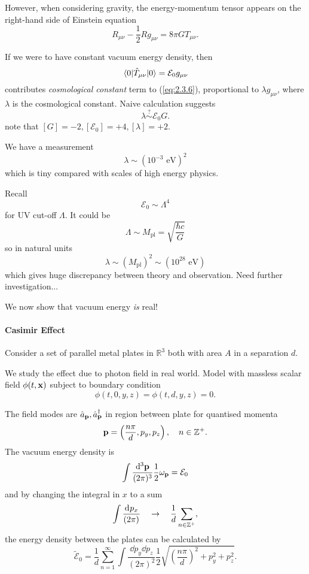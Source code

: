 \documentclass[a4paper,11pt]{article}
\begin{document}
	However, when considering gravity, the energy-momentum tensor appears on the right-hand side of Einstein equation
	\begin{equation}
		R _{\mu \nu} - \frac{1}{2} R g _{\mu \nu} = 8 \pi G T _{\mu \nu}.
		\label{eq:2.3.6}
	\end{equation}

	
	If we were to have constant vacuum energy density, then
	\[
		\mel{0}{\hat T _{\mu \nu}}{0} = \mathcal{E}_0 g _{\mu \nu}
	\]
	contributes \emph{cosmological constant} term to (\ref{eq:2.3.6}), proportional to $\lambda g _{\mu \nu}$, where $\lambda$ is the cosmological constant. Naive calculation suggests
	\[
		\lambda \overset{?}{\sim} \mathcal{E}_0 G.
	\]
	note that $[G] = -2, [\mathcal{E}_0] = + 4, [\lambda] = +2$. 

	We have a measurement
	\[
		\lambda \sim (10 ^{-3}\text{ eV})^2
	\]
	which is tiny compared with scales of high energy physics.

	Recall
	\[
		\mathcal{E}_0 \sim \Lambda^4
	\]
	for UV cut-off $\Lambda$. It could be
	\[
		\Lambda \sim M _{\text{pl}} = \sqrt{\frac{\hbar c}{G}}
	\]
	so in natural units
	\[
		\lambda \sim (M _{\text{pl}})^2 \sim (10 ^{28} \text{ eV})
	\]
	which gives huge discrepancy between theory and observation. Need further investigation... 

	We now show that vacuum energy \emph{is} real!

	\paragraph{Casimir Effect} Consider a set of parallel metal plates in $\mathbb{R}^3$ both with area $A$ in a separation $d$.

		
	We study the effect due to photon field in real world. Model with massless scalar field $\phi(t,\vb x)$ subject to boundary condition
	\[
		\phi(t,0,y,z) = \phi(t,d,y,z) = 0.
	\]
	
	The field modes are $\hat a _{\vb p}, \hat a^\dagger _{\vb p}$ in region between plate for quantised momenta \[
		\vb p = \left( \frac{n \pi}{d}, p_y, p_z \right), \quad n \in \mathbb{Z}^{+}.
	\]
	The vacuum energy density is
	\[
		\int \frac{\dd[3]{\vb p}}{(2\pi)^{3}} \frac{1}{2} \omega _{\vb p} = \mathcal{E}_0
	\]
	and by changing the integral in $x$ to a sum
	\[
		\int \frac{\dd[]{p_x}}{(2\pi)^{}} \quad \to \quad \frac{1}{d}\sum _{n \in \mathbb{Z}^+},
	\]
	the energy density between the plates can be calculated by
	\[
		\tilde{\mathcal{E}}_0 = \frac{1}{d} \sum _{n = 1}^{\infty} \int \frac{\dd{p_y} \dd{p_z}}{(2 \pi)^2} \frac{1}{2} \sqrt{\left( \frac{n \pi}{d} \right)^2 + p_y^2 + p_z^2}.
	\]
	
\end{document}
